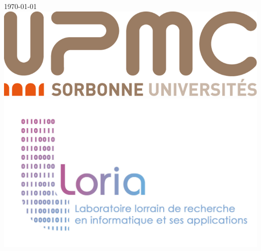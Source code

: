 \documentclass[a4paper,11pt]{article}
\begin{document}
\begin{titlepage}


{\large \today}\\[1.5cm] %


\includegraphics[scale=0.2]{Pictures/png/UPMC_sorbonne.png}\hspace{3cm}
\includegraphics[scale=0.1]{Pictures/loria_logo.jpg}


\vfill %
\end{titlepage}
\clearpage
\end{document}
